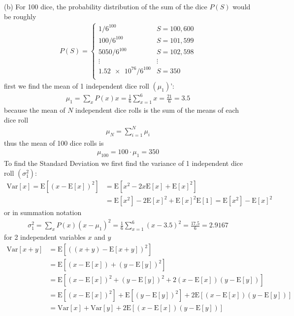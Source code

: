 \documentclass[../main.tex]{subfiles}
\newcommand{\E}{\mathrm{E}}
\newcommand{\Var}{\mathrm{Var}}
\begin{document}
(b) For 100 dice, the probability distribution of the sum of the dice $P(S)$ would be roughly
\begin{align*}
    P(S) = \begin{cases}
        1/6^{100} & S = 100, 600 \\
        100/6^{100} & S = 101, 599 \\
        5050/6^{100} & S = 102, 598 \\
        \vdots & \vdots \\
        \num{1.52e76}/6^{100} & S = 350 \\
    \end{cases}
\end{align*}
first we find the mean of 1 independent dice roll $(\mu_1)$':
\begin{align*}
    \mu_1 = \sum_{x} P(x) x = \frac{1}{6} \sum_{x=1}^{6} x = \frac{21}{6} = 3.5
\end{align*}
because the mean of $N$ independent dice rolls is the sum of the means of each dice roll
\begin{align*}
    \mu_N = \sum_{i=1}^{N} \mu_i
\end{align*}
thus the mean of 100 dice rolls is
\begin{align*}
    \mu_{100} = 100 \cdot \mu_1 = \boxed{350}
\end{align*}
To find the Standard Deviation we first find the variance of 1 independent dice roll $(\sigma_1^2)$:
\begin{align*}
    \Var[x] = \E[(x - \E[x])^2] &= \E[ x^2 - 2x\E[x] + \E[x]^2 ] \\
    &= \E[x^2] - 2\E[x]^2 + \E[x]^2\E[1] = \E[x^2] - \E[x]^2
\end{align*}
or in summation notation
\begin{align*}
    \sigma_1^2 = \sum_{x} P(x) (x - \mu_1)^2 = \frac{1}{6} \sum_{x=1}^{6} (x - 3.5)^2
    = \frac{17.5}{6} = 2.9167
\end{align*}
for 2 independent variables $x$ and $y$
\begin{align*}
    \Var[x + y] &= \E[((x + y) - \E[x + y])^2] \\
    &= \E[(x - \E[x]) + (y - \E[y])^2] \\
    &= \E[(x - \E[x])^2 + (y - \E[y])^2 + 2(x - \E[x])(y - \E[y])] \\
    &= \E[(x - \E[x])^2] + \E[(y - \E[y])^2] + 2\E[(x - \E[x])(y - \E[y])] \\
    &= \Var[x] + \Var[y] + 2\E[(x - \E[x])(y - \E[y])]
\end{align*}
\end{document}
